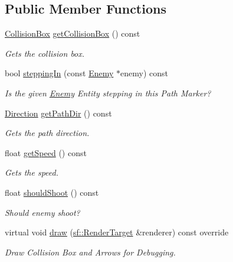 \subsection*{Public Member Functions}
\begin{DoxyCompactItemize}
\item 
\mbox{\hyperlink{class_collision_box}{Collision\+Box}} \mbox{\hyperlink{class_path_marker_aff1668ccb59dea30e37e6207c3c18e84}{get\+Collision\+Box}} () const
\begin{DoxyCompactList}\small\item\em Gets the collision box. \end{DoxyCompactList}\item 
bool \mbox{\hyperlink{class_path_marker_a212b9b719c54d2fae7e9e0b89577d24a}{stepping\+In}} (const \mbox{\hyperlink{class_enemy}{Enemy}} $\ast$enemy) const
\begin{DoxyCompactList}\small\item\em Is the given \mbox{\hyperlink{class_enemy}{Enemy}} Entity stepping in this Path Marker? \end{DoxyCompactList}\item 
\mbox{\label{class_path_marker_ab1295cdfe1078a9399074f9660cb9eb0}} 
\mbox{\hyperlink{class_path_marker_a5cc5188373e0b67016a99d3ded49f301}{Direction}} \mbox{\hyperlink{class_path_marker_ab1295cdfe1078a9399074f9660cb9eb0}{get\+Path\+Dir}} () const
\begin{DoxyCompactList}\small\item\em Gets the path direction. \end{DoxyCompactList}\item 
\mbox{\label{class_path_marker_aae474f6dba9cd2343fc326fc99587fc6}} 
float \mbox{\hyperlink{class_path_marker_aae474f6dba9cd2343fc326fc99587fc6}{get\+Speed}} () const
\begin{DoxyCompactList}\small\item\em Gets the speed. \end{DoxyCompactList}\item 
float \mbox{\hyperlink{class_path_marker_acf1d0c86376d89b82cc669390e173436}{should\+Shoot}} () const
\begin{DoxyCompactList}\small\item\em Should enemy shoot? \end{DoxyCompactList}\item 
virtual void \mbox{\hyperlink{class_path_marker_a8dae7801545e5cea55285af8e55d9888}{draw}} (\mbox{\hyperlink{classsf_1_1_render_target}{sf\+::\+Render\+Target}} \&renderer) const override
\begin{DoxyCompactList}\small\item\em Draw Collision Box and Arrows for Debugging. \end{DoxyCompactList}\end{DoxyCompactItemize}
